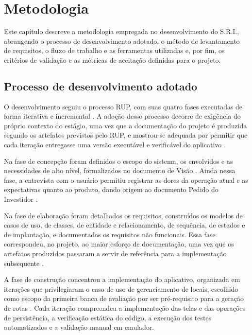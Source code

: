 \chapter{Metodologia}\label{cap:metodologia}

Este capítulo descreve a metodologia empregada no desenvolvimento do S.R.I., abrangendo o processo de desenvolvimento adotado, o método de levantamento de requisitos, o fluxo de trabalho e as ferramentas utilizadas e, por fim, os critérios de validação e as métricas de aceitação definidas para o projeto.

\section{Processo de desenvolvimento adotado}

O desenvolvimento seguiu o processo RUP, com suas quatro fases executadas de forma iterativa e incremental \cite{kruchten2003}. A adoção desse processo decorre de exigência do próprio contexto do estágio, uma vez que a documentação do projeto é produzida segundo os artefatos previstos pelo RUP, e mostrou-se adequada por permitir que cada iteração entregasse uma versão executável e verificável do aplicativo \cite{sriEspecComp2025}.

Na fase de concepção foram definidos o escopo do sistema, os envolvidos e as necessidades de alto nível, formalizados no documento de Visão \cite{sriVisao2025}. Ainda nessa fase, a entrevista com o usuário permitiu registrar as dores da operação atual e as expectativas quanto ao produto, dando origem ao documento Pedido do Investidor \cite{sriPedido2025}.

Na fase de elaboração foram detalhados os requisitos, construídos os modelos de casos de uso, de classes, de entidade e relacionamento, de sequência, de estados e de implantação, e documentados os requisitos não funcionais. Essa fase correspondeu, no projeto, ao maior esforço de documentação, uma vez que os artefatos produzidos passaram a servir de referência para a implementação subsequente \cite{sriEspecUC2026, sriEspecComp2025}.

A fase de construção concentrou a implementação do aplicativo, organizada em iterações que privilegiaram o caso de uso de gerenciamento de locais, escolhido como escopo da primeira banca de avaliação por ser pré-requisito para a geração de rotas \cite{sriEspecUC2026}. Cada iteração compreendeu a implementação das telas e das operações de persistência, a verificação estática do código, a execução dos testes automatizados e a validação manual em emulador.


